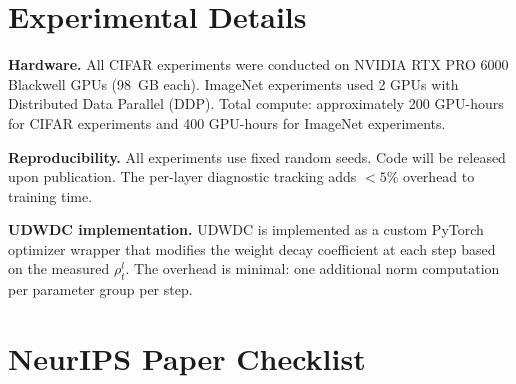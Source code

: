 \documentclass{article}
\begin{document}



\appendix
\section{Experimental Details}
\label{app:details}

\textbf{Hardware.} All CIFAR experiments were conducted on NVIDIA RTX PRO 6000 Blackwell GPUs (98~GB each). ImageNet experiments used 2 GPUs with Distributed Data Parallel (DDP). Total compute: approximately 200 GPU-hours for CIFAR experiments and 400 GPU-hours for ImageNet experiments.

\textbf{Reproducibility.} All experiments use fixed random seeds. Code will be released upon publication. The per-layer diagnostic tracking adds $<5\%$ overhead to training time.

\textbf{UDWDC implementation.} UDWDC is implemented as a custom PyTorch optimizer wrapper that modifies the weight decay coefficient at each step based on the measured $\rho_t^l$. The overhead is minimal: one additional norm computation per parameter group per step.

\newpage
\section*{NeurIPS Paper Checklist}
\end{document}
